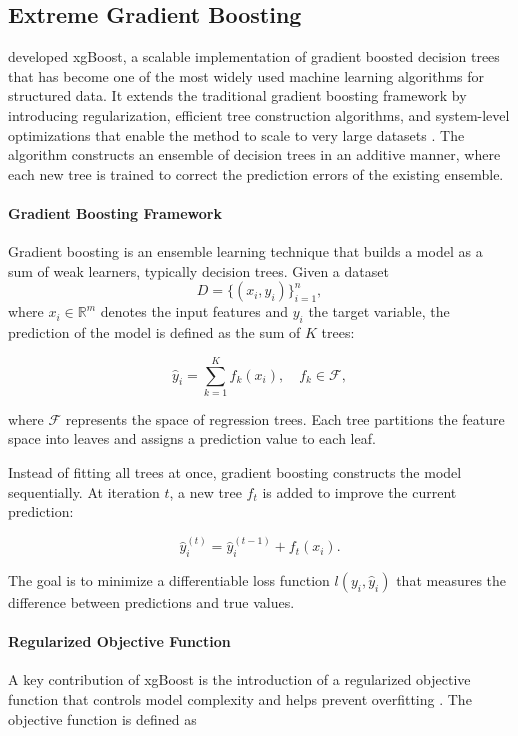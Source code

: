 \subsection{Extreme Gradient Boosting}\label{sec:xgBoost}

\citet{Chen2016} developed \gls{xgBoost}, a scalable implementation of gradient boosted decision trees that has become one of the most widely used machine learning algorithms for structured data. It extends the traditional gradient boosting framework by introducing regularization, efficient tree construction algorithms, and system-level optimizations that enable the method to scale to very large datasets \citep{Chen2016}. The algorithm constructs an ensemble of decision trees in an additive manner, where each new tree is trained to correct the prediction errors of the existing ensemble.

\paragraph{Gradient Boosting Framework}

Gradient boosting is an ensemble learning technique that builds a model as a sum of weak learners, typically decision trees. Given a dataset
\[
D = \{(x_i, y_i)\}_{i=1}^{n} ,
\]
where $x_i \in \mathbb{R}^m$ denotes the input features and $y_i$ the target variable, the prediction of the model is defined as the sum of $K$ trees:

\[
\hat{y}_i = \sum_{k=1}^{K} f_k(x_i), \quad f_k \in \mathcal{F} ,
\]

where $\mathcal{F}$ represents the space of regression trees. Each tree partitions the feature space into leaves and assigns a prediction value to each leaf.

Instead of fitting all trees at once, gradient boosting constructs the model sequentially. At iteration $t$, a new tree $f_t$ is added to improve the current prediction:

\[
\hat{y}_i^{(t)} = \hat{y}_i^{(t-1)} + f_t(x_i).
\]

The goal is to minimize a differentiable loss function $l(y_i,\hat{y}_i)$ that measures the difference between predictions and true values.

\paragraph{Regularized Objective Function}\label{sec:xgBoost/regularization}

A key contribution of \gls{xgBoost} is the introduction of a regularized objective function that controls model complexity and helps prevent overfitting \citep{Chen2016}. The objective function is defined as


